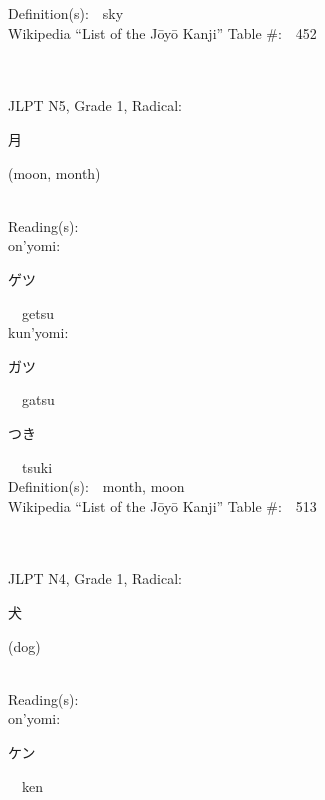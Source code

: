 \begin{multicols}{2}
Definition(s):\ \ sky \\
Wikipedia ``List of the J\=oy\=o Kanji'' Table \#:\ \ 452 \\
\ \ \\
{\fontsize{34pt}{40pt}  }\ \ \\  %
{JLPT N5, Grade 1, Radical:\ \ {\begin{CJK}{UTF8}{min} 月 \end{CJK}} (moon, month) } \\
Reading(s):\ \ \\
{\hspace*{1em}}on'yomi:\ \ \\
{\hspace*{2em}}{\begin{CJK}{UTF8}{min} ゲツ \end{CJK}}\ \ getsu\ \ \\
{\hspace*{1em}}kun'yomi:\ \ \\
{\hspace*{2em}}{\begin{CJK}{UTF8}{min} ガツ \end{CJK}}\ \ gatsu\ \ \\
{\hspace*{2em}}{\begin{CJK}{UTF8}{min} つき \end{CJK}}\ \ tsuki\ \ \\
Definition(s):\ \ month, moon \\
Wikipedia ``List of the J\=oy\=o Kanji'' Table \#:\ \ 513 \\
\ \ \\
{\fontsize{34pt}{40pt}  }\ \ \\  %
{JLPT N4, Grade 1, Radical:\ \ {\begin{CJK}{UTF8}{min} 犬 \end{CJK}} (dog) } \\
Reading(s):\ \ \\
{\hspace*{1em}}on'yomi:\ \ \\
{\hspace*{2em}}{\begin{CJK}{UTF8}{min} ケン \end{CJK}}\ \ ken\ \ \\

\end{multicols}

